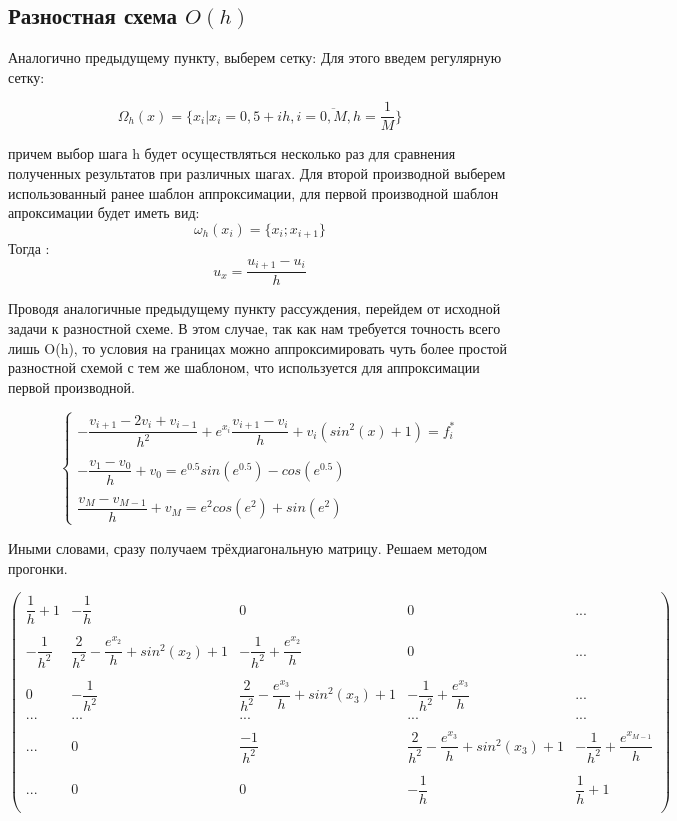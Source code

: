 \documentclass[12pt]{article}
\begin{document}
\subsection{Разностная схема $O(h)$}

Аналогично предыдущему пункту, выберем сетку:
Для этого введем регулярную сетку:

$$
\Omega_h(x) = \{x_i | x_i = 0,5 + ih, i = \overline{0, M}, h = \dfrac{1}{M}\}
$$

причем выбор шага h будет осуществляться несколько раз для сравнения полученных результатов при различных шагах.
Для второй производной выберем использованный ранее шаблон аппроксимации, для первой производной шаблон апроксимации будет иметь вид:
$$
\omega_h(x_i) = \{ x_{i}; x_{i + 1}\}
$$
Тогда :
$$
u_x = \dfrac{u_{i + 1} - u_{i}}{h}
$$

Проводя аналогичные предыдущему пункту рассуждения, перейдем от исходной задачи к разностной схеме. В этом случае, так как нам требуется точность всего лишь O(h), то условия на границах можно аппроксимировать чуть более простой разностной схемой с тем же шаблоном, что используется для аппроксимации первой производной.

$$
\begin{cases}
- \dfrac{v_{i+1} - 2v_i + v_{i - 1}}{h^2} + e^{x_i}\dfrac{v_{i+1} - v_i}{h} + v_i(sin^2(x) + 1) = f_i^* \\
\\
- \dfrac{v_1 - v_0}{h} + v_0 = e^{0.5}sin(e^{0.5}) - cos(e^{0.5}) \\
\\
\dfrac{v_M - v_{M-1}}{h} + v_M = e^2cos(e^2) + sin(e^2)
\end{cases}
$$


Иными словами, сразу получаем трёхдиагональную матрицу. Решаем методом прогонки.

$$
\begin{pmatrix}
	\dfrac{1}{h} + 1& -\dfrac{1}{h} &  0 & 0 & ... \\
	\\
	-\dfrac{1}{h^2}  & \dfrac{2}{h^2} - \dfrac{e^{x_2}}{h} + sin^2(x_2) + 1 & -\dfrac{1}{h^2} + \dfrac{e^{x_2}}{h} & 0 & ... \\
	\\
	0 & -\dfrac{1}{h^2} & \dfrac{2}{h^2} - \dfrac{e^{x_3}}{h} + sin^2(x_3) + 1 &
	 -\dfrac{1}{h^2} + \dfrac{e^{x_3}}{h} & ... \\
	... & ... & ... & ... & ... \\
	\\
	... & 0 & \dfrac{-1}{h^2} & \dfrac{2}{h^2} - \dfrac{e^{x_3}}{h} + sin^2(x_3) + 1 &
	 -\dfrac{1}{h^2} + \dfrac{e^{x_{M-1}}}{h} \\
	\\
	... & 0 & 0 & -\dfrac{1}{h} & \dfrac{1}{h} + 1\\
\end{pmatrix}
$$
\end{document}
